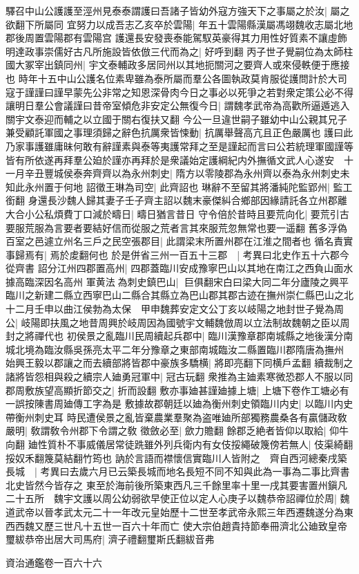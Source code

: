 驛召中山公護護至涇州見泰泰謂護曰吾諸子皆幼外寇方強天下之事屬之於汝|{
	屬之欲翻下所屬同}
宜努力以成吾志乙亥卒於雲陽|{
	年五十雲陽縣漢屬馮翊魏收志屬北地郡後周置雲陽郡有雲陽宫}
護還長安發喪泰能駕馭英豪得其力用性好質素不讓虛飾明達政事崇儒好古凡所施設皆依倣三代而為之|{
	好呼到翻}
丙子世子覺嗣位為太師柱國大冢宰出鎮同州|{
	宇文泰輔政多居同州以其地扼關河之要齊人或來侵軼便于應接也}
時年十五中山公護名位素卑雖為泰所屬而羣公各圖執政莫肯服從護問計於大司寇于謹謹曰謹早蒙先公非常之知恩深骨肉今日之事必以死爭之若對衆定策公必不得讓明日羣公會議謹曰昔帝室傾危非安定公無復今日|{
	謂魏孝武帝為高歡所逼遁逃入關宇文泰迎而輔之以立國于關右復扶又翻}
今公一旦違世嗣子雖幼中山公親其兄子兼受顧託軍國之事理須歸之辭色抗厲衆皆悚動|{
	抗厲舉聲高亢且正色嚴厲也}
護曰此乃家事護雖庸昧何敢有辭謹素與泰等夷護常拜之至是謹起而言曰公若統理軍國謹等皆有所依遂再拜羣公廹於謹亦再拜於是衆議始定護綱紀内外撫循文武人心遂安　十一月辛丑豐城侯泰奔齊齊以為永州刺史|{
	隋方以零陵郡為永州齊以泰為永州刺史未知此永州置于何地}
詔徵王琳為司空|{
	此齊詔也}
琳辭不至留其將潘純陀監郢州|{
	監工銜翻}
身還長沙魏人歸其妻子壬子齊主詔以魏末豪傑糾合鄉部因緣請託各立州郡離大合小公私煩費丁口減於疇日|{
	疇日猶言昔日}
守令倍於昔時且要荒向化|{
	要荒引古要服荒服為言要者要結好信而從服之荒者言其來服荒忽無常也要一遥翻}
舊多浮偽百室之邑遽立州名三戶之民空張郡目|{
	此謂梁末所置州郡在江淮之間者也}
循名責實事歸焉有|{
	焉於䖍翻何也}
於是併省三州一百五十三郡　|{
	考異曰北史作五十六郡今從齊書}
詔分江州四郡置高州|{
	四郡蓋臨川安成豫寧巴山以其地在南江之西負山面水據高臨深因名高州}
軍黄法為刺史鎮巴山|{
	巨俱翻宋白曰梁大同二年分廬陵之興平臨川之新建二縣立西寧巴山二縣合其縣立為巴山郡其郡古迹在撫州崇仁縣巴山之北}
十二月壬申以曲江侯勃為太保　甲申魏葬安定文公丁亥以岐陽之地封世子覺為周公|{
	岐陽即扶風之地昔周興於岐周因為國號宇文輔魏倣周以立法制故魏朝之臣以周封之將禪代也}
初侯景之亂臨川民周續起兵郡中|{
	臨川漢豫章郡南城縣之地後漢分南城北境為臨汝縣吳孫亮太平二年分豫章之東部南城臨汝二縣置臨川郡隋唐為撫州}
始興王毅以郡讓之而去續部將皆郡中豪族多驕横|{
	將即亮翻下同横戶孟翻}
續裁制之諸將皆怨相與殺之續宗人廸勇冠軍中|{
	冠古玩翻}
衆推為主廸素寒微恐郡人不服以同郡周敷族望高顯折節交之|{
	折而設翻}
敷亦事廸甚謹廸據上塘|{
	上塘下卷作工塘必有一誤按陳書周廸傳工字為是}
敷據故郡朝廷以廸為衡州刺史領臨川内史|{
	以臨川内史帶衡州刺史耳}
時民遭侯景之亂皆棄農業羣聚為盗唯廸所部獨務農桑各有贏儲政敎嚴明|{
	敎謂敎令州郡下令謂之敎}
徵斂必至|{
	歛力贍翻}
餘郡乏絶者皆仰以取給|{
	仰牛向翻}
廸性質朴不事威儀居常徒跣雖外列兵衛内有女伎挼繩破篾傍若無人|{
	伎渠綺翻挼奴禾翻篾莫結翻竹筠也}
訥於言語而襟懷信實臨川人皆附之　齊自西河總秦戌築長城　|{
	考異曰去歲六月已云築長城而地名長短不同不知與此為一事為二事比齊書北史皆然今皆存之}
東至於海前後所築東西凡三千餘里率十里一戌其要害置州鎭凡二十五所　魏宇文護以周公幼弱欲早使正位以定人心庚子以魏恭帝詔禪位於周|{
	魏道武帝以晉孝武太元二十一年改元皇始歷十二世至孝武帝永熙三年西遷魏遂分為東西西魏又歷三世凡十五世一百六十年而亡}
使大宗伯趙貴持節奉冊濟北公廸致皇帝璽紱恭帝出居大司馬府|{
	濟子禮翻璽斯氏翻紱音弗}


資治通鑑卷一百六十六
